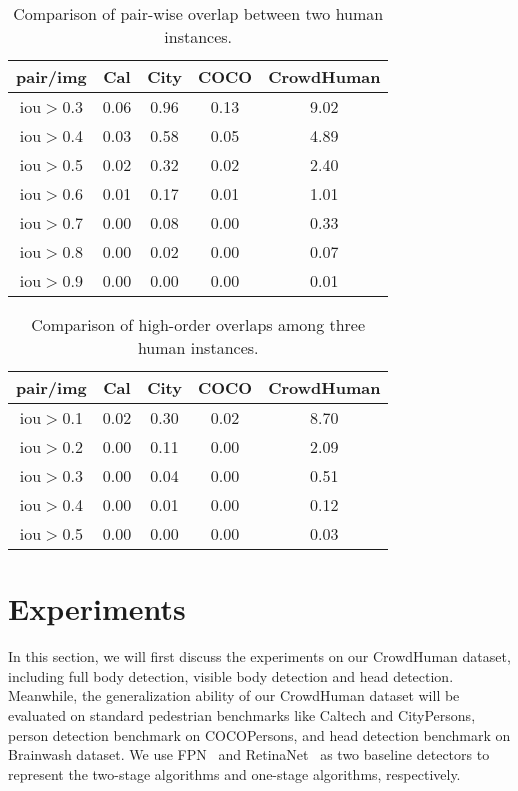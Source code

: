 \documentclass[10pt,twocolumn,letterpaper]{article}
\begin{document}
\begin{table}
\begin{center}
\begin{tabular}{c|cccc}
{pair/img} & {Cal} & {City} & {COCO} & {CrowdHuman} \\
\hline
{iou$>$0.3} & {0.06} & {0.96} & {0.13} & {9.02} \\
{iou$>$0.4} & {0.03} & {0.58} & {0.05} & {4.89} \\
{iou$>$0.5} & {0.02} & {0.32} & {0.02} & {2.40} \\
{iou$>$0.6} & {0.01} & {0.17} & {0.01} & {1.01} \\
{iou$>$0.7} & {0.00} & {0.08} & {0.00} & {0.33} \\
{iou$>$0.8} & {0.00} & {0.02} & {0.00} & {0.07} \\
{iou$>$0.9} & {0.00} & {0.00} & {0.00} & {0.01} \\
\end{tabular}
\caption{Comparison of pair-wise overlap between two human instances.} \label{tab:PairOverlap}
\end{center}

\end{table}


\begin{table}
\begin{center}
\begin{tabular}{c|cccc}
{pair/img} & \multicolumn{1}{c}{Cal} & \multicolumn{1}{c}{City} & \multicolumn{1}{c}{COCO} & \multicolumn{1}{c}{CrowdHuman} \\
\hline
{iou$>$0.1} & {0.02} & {0.30} & {0.02} & {8.70} \\
{iou$>$0.2} & {0.00} & {0.11} & {0.00} & {2.09} \\
{iou$>$0.3} & {0.00} & {0.04} & {0.00} & {0.51} \\
{iou$>$0.4} & {0.00} & {0.01} & {0.00} & {0.12} \\
{iou$>$0.5} & {0.00} & {0.00} & {0.00} & {0.03} \\
\end{tabular}
\end{center}
\caption{Comparison of high-order overlaps among three human instances.} \label{tab:highorderOverlap}
\end{table}

\section{Experiments}

In this section, we will first discuss the experiments on our CrowdHuman dataset, including full body detection, visible body detection and head detection. Meanwhile, the generalization ability of our CrowdHuman dataset will be evaluated on standard pedestrian benchmarks like Caltech and CityPersons, person detection benchmark on COCOPersons, and head detection benchmark on Brainwash dataset. We use FPN~\cite{lin2017feature} and RetinaNet~\cite{lin2017focal} as two baseline detectors to represent the two-stage algorithms and one-stage algorithms, respectively. 
\end{document}
